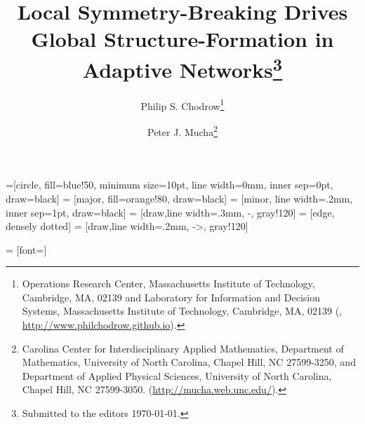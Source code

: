 

\usepackage{lipsum}
\usepackage{amsfonts}
\usepackage{graphicx}
\usepackage{epstopdf}
\usepackage{algorithmic}
\usepackage{tikz}
\usepackage{subcaption} 
\usepackage{pc_math}
\usepackage{amssymb}
\usepackage{bbm}
\usepackage[disable, color=gray!60]{todonotes}
\graphicspath{{fig/}}

=[circle, fill=blue!50, minimum size=10pt, line width=0mm, inner sep=0pt, draw=black]
 = [major, fill=orange!80, draw=black]
 = [minor, line width=.2mm, inner sep=1pt, draw=black]
 = [draw,line width=.3mm, -, gray!120]
 = [edge,  densely dotted]
 = [draw,line width=.2mm, ->, gray!120]


 = [font=\small]

\ifpdf
\else
\fi

\newcommand{\creflastconjunction}{, and~}



\title{Local Symmetry-Breaking Drives Global Structure-Formation in Adaptive Networks\thanks{Submitted to the editors \today.
}}

\author{Philip S. Chodrow\thanks{Operations Research Center, Massachusetts Institute of Technology, Cambridge, MA, 02139 and Laboratory for Information and Decision Systems, Massachusetts Institute of Technology, Cambridge, MA, 02139
  (, \url{http://www.philchodrow.github.io}).}
\and Peter J. Mucha\thanks{Carolina Center for Interdisciplinary Applied Mathematics, Department of Mathematics, University of North Carolina, Chapel Hill, NC 27599-3250, and Department of Applied Physical Sciences, University of North Carolina, Chapel Hill, NC 27599-3050. 
  (\url{http://mucha.web.unc.edu/}).}}

\usepackage{amsopn}
